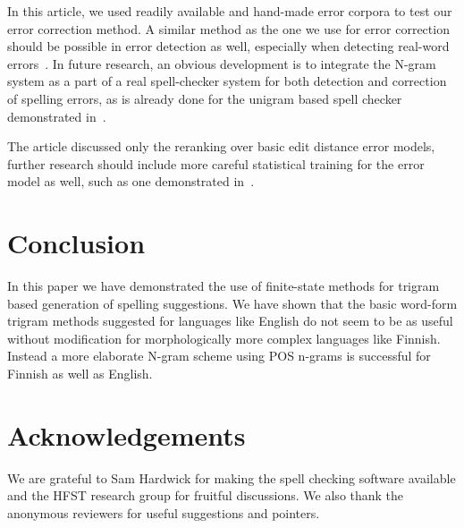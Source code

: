 \documentclass[postprint]{flammie}
\begin{document}
In this article, we used readily available and hand-made error corpora to test
our error correction method. A similar method as the one we use for error
correction should be possible in error detection as well, especially when
detecting real-word errors~\cite{mays/1991}. In future research, an obvious
development is to integrate the N-gram system as a part of a real spell-checker
system for both detection and correction of spelling errors, as is already done
for the unigram based spell checker demonstrated in~\cite{pirinen/2010/lrec}.

The article discussed only the reranking over basic edit distance error
models, further research should include more careful statistical training for
the error model as well, such as one demonstrated in~\cite{brill/2000}. 

\section{Conclusion}

In this paper we have demonstrated the use of finite-state methods for trigram
based generation of spelling suggestions. We have shown that the basic
word-form trigram methods suggested for languages like English do not seem to
be as useful without modification for morphologically more complex languages
like Finnish.  Instead a more elaborate N-gram scheme using  POS n-grams is
successful for Finnish as well as English.

\section*{Acknowledgements}

We are grateful to Sam Hardwick for making the spell checking software
available and the HFST research group for fruitful discussions. We also thank
the anonymous reviewers for useful suggestions and pointers.



\end{document}
